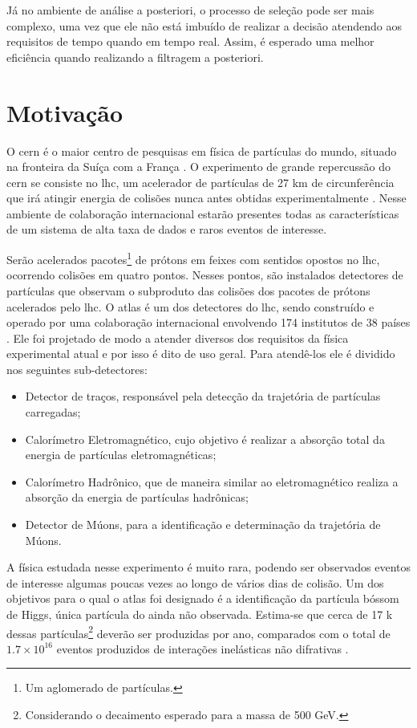 Já no ambiente de análise a posteriori, o processo de seleção pode ser mais
complexo, uma vez que ele não está imbuído de realizar a decisão atendendo aos
requisitos de tempo quando em tempo real. Assim, é esperado 
uma melhor eficiência quando realizando a filtragem a posteriori.

\section{Motivação} 

O \gls{cern} é o maior centro de
pesquisas em física de partículas do mundo, situado na fronteira da Suíça com a
França \cite{webCERN}. O experimento de grande repercussão do \gls{cern} se
consiste no \gls{lhc}, um acelerador de partículas de 27 km de
circunferência que irá atingir energia de colisões nunca antes obtidas
experimentalmente \cite{webLHC}. 
Nesse ambiente de colaboração internacional estarão presentes
todas as características de um sistema de alta taxa de dados e raros eventos de
interesse.

Serão acelerados pacotes\footnote{Um aglomerado de partículas.} de prótons em
feixes com sentidos opostos no \gls{lhc},
ocorrendo colisões em quatro pontos. Nesses pontos, são instalados 
detectores de partículas que observam o subproduto das colisões dos pacotes de prótons 
acelerados pelo \gls{lhc}. O \gls{atlas} é um dos detectores do
\gls{lhc}, sendo construído e operado por 
uma colaboração internacional envolvendo 174 institutos de 38
países \cite{webATLAS}. Ele foi projetado 
de modo a atender diversos dos requisitos da física experimental atual e por isso é dito de uso
geral. Para atendê-los ele é dividido nos seguintes sub-detectores:

\begin{itemize}
\item Detector de traços, responsável pela detecção da trajetória de partículas carregadas;
\item Calorímetro Eletromagnético, cujo objetivo é realizar a absorção total da
energia de partículas eletromagnéticas;
\item Calorímetro Hadrônico, que de maneira similar ao eletromagnético realiza a
absorção da energia de partículas hadrônicas;
\item Detector de Múons, para a identificação e determinação da trajetória de
Múons.
\end{itemize}

A física estudada nesse experimento é muito rara, podendo ser observados eventos
de interesse algumas poucas vezes ao longo de vários dias de colisão. 
Um dos objetivos para o qual o \gls{atlas} foi 
designado é a identificação da partícula bóssom de Higgs, única partícula 
do  ainda não observada. Estima-se que cerca de 17 k dessas
partículas\footnote{Considerando o decaimento esperado para a massa de 500 GeV.} deverão ser produzidas por ano, comparados
com o total de $1.7\times10^{16}$ eventos produzidos de interações inelásticas
não difrativas \cite{resumo_ATLAS}. 

